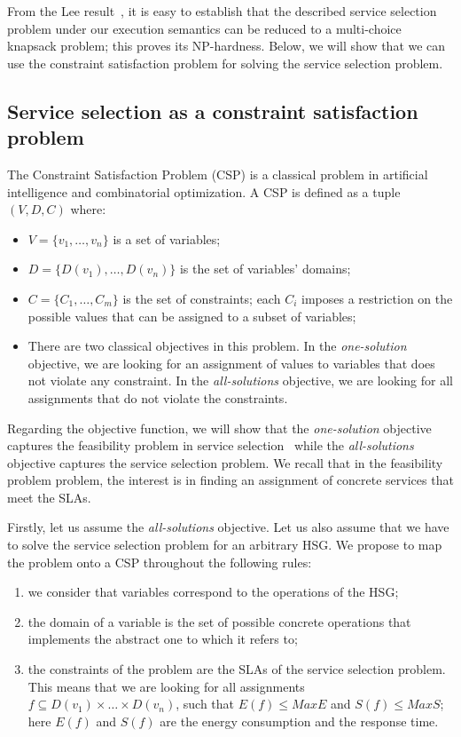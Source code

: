 \documentclass[a4paper]{article}
\begin{document}
From the Lee result~\cite{Lee}, it is easy to establish that the described service selection 
problem under our execution semantics can be reduced to a multi-choice knapsack problem; this  
proves its NP-hardness. Below, we will show that we can use the constraint satisfaction problem 
for solving the service selection problem. 


\subsection{Service selection as a constraint satisfaction problem} \label{Decomposition}
The Constraint Satisfaction Problem (CSP) is a classical problem in artificial intelligence and combinatorial optimization. 
A CSP is defined as a tuple $(V, D, C)$
where:
\begin{itemize}
\item $V = \{ v_1,\dots, v_n \}$ is a set of variables;
\item $D = \{ D(v_1),\dots, D(v_n)\}$ is the set of variables' domains;
\item $C = \{C_1,\dots, C_m\}$ is the set of constraints; each $C_i$ imposes a restriction on the possible 
values that can be assigned to a subset of variables; 
\item There are two classical objectives in this problem. In the {\it one-solution} objective, we are 
looking for an assignment of values to variables that does not violate any constraint. In the {\it all-solutions}  
objective, we are looking for all assignments that do not violate the constraints. 
\end{itemize}

Regarding the objective function, we will show that the  {\it one-solution} objective captures the 
feasibility problem in service selection~\cite{Ardagna,JISA} while the {\it all-solutions} objective captures the 
service selection problem. We recall that in the feasibility problem problem, the interest is in 
finding an assignment of concrete services that meet the SLAs.  

Firstly, let us assume the {\it all-solutions} objective. 
Let us also assume that we have to solve the service selection problem for an arbitrary HSG. We propose to map 
the problem onto a  CSP throughout the following rules:
\begin{enumerate}
\item we consider that variables correspond to the operations of the HSG;
\item the domain of a variable is the set of possible concrete operations that 
implements the abstract one to which it refers to;
\item the constraints of the problem are the SLAs of the service selection problem. This means that 
we are looking for all assignments $f \subseteq  D(v_1)\times \dots \times D(v_n)$, such 
that $E(f) \leq MaxE$ and $S(f) \leq MaxS$; here $E(f)$ and $S(f)$ are the 
energy consumption and the response time.
\end{enumerate}
\end{document}
